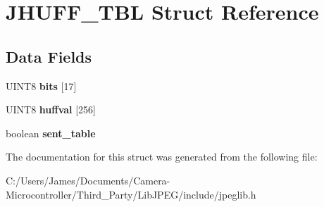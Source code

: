 \hypertarget{struct_j_h_u_f_f___t_b_l}{}\section{J\+H\+U\+F\+F\+\_\+\+T\+BL Struct Reference}
\label{struct_j_h_u_f_f___t_b_l}
\subsection*{Data Fields}
\begin{DoxyCompactItemize}
\item 
\mbox{\label{struct_j_h_u_f_f___t_b_l_aec2f5f13f94e06c5b2d5814dabea41ea}} 
U\+I\+N\+T8 {\bfseries bits} \mbox{[}17\mbox{]}
\item 
\mbox{\label{struct_j_h_u_f_f___t_b_l_ab6c879574a983ff39f1f8f5d5f116fd6}} 
U\+I\+N\+T8 {\bfseries huffval} \mbox{[}256\mbox{]}
\item 
\mbox{\label{struct_j_h_u_f_f___t_b_l_a80c1474699407698d9e13602c7287e38}} 
boolean {\bfseries sent\+\_\+table}
\end{DoxyCompactItemize}


The documentation for this struct was generated from the following file\+:\begin{DoxyCompactItemize}
\item 
C\+:/\+Users/\+James/\+Documents/\+Camera-\/\+Microcontroller/\+Third\+\_\+\+Party/\+Lib\+J\+P\+E\+G/include/jpeglib.\+h\end{DoxyCompactItemize}
